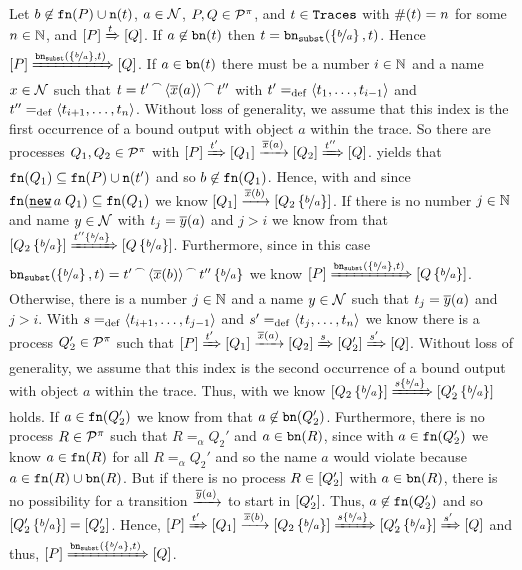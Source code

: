 \begin{prf}
Let $b\not\in\mathtt{fn}(P)\cup\mathtt{n}(t)$, $a\in\mathcal N$, $P,Q\in\mathcal P^{\pi}$, and $t\in\mathtt{Traces}$ with $\#(t)=n$ for some $n\in\mathbb N$, and $\left[P\right]\xRightarrow{t}\left[Q\right]$. If $a\not\in\mathtt{bn}(t)$ then $t=\mathtt{bn}_{\mathtt{subst}}(\left\{\nicefrac{b}{a}\right\},t)$. Hence $\left[P\right]\xRightarrow{\mathtt{bn}_{\mathtt{subst}}(\left\{\nicefrac{b}{a}\right\},t)}\left[Q\right]$. If $a\in\mathtt{bn}(t)$ there must be a number $i\in\mathbb N$ and a name $x\in\mathcal N$ such that $t={t'}^{\,\frown{}\,}{{\langle\overline{x}(a)\rangle}^{\,\frown{}\,}{t''}}$ with $t'=_{\mathrm{def}}{}\langle t_1,\ldots,t_{i-1}\rangle$ and $t''=_{\mathrm{def}}\langle t_{i+1},\ldots,t_n\rangle$. Without loss of generality, we assume that this index is the first occurrence of a bound output with object $a$ within the trace. So there are processes $Q_1,Q_2\in\mathcal P^{\pi}$ with $\left[P\right]\xRightarrow{t'}\left[Q_1\right]\xrightarrow{\overline{x}(a)}\left[Q_2\right]\xRightarrow{t''}\left[Q\right]$.  yields that $\mathtt{fn}(Q_1)\subseteq\mathtt{fn}(P)\cup\mathtt{n}(t')$ and so $b\not\in\mathtt{fn}(Q_1)$. Hence, with  and since $\fn{\procres{a}{Q_1}}\subseteq\fn{Q_1}$ we know $\left[Q_1\right]\xrightarrow{\overline{x}(b)}\left[Q_2\left\{\nicefrac{b}{a}\right\}\right]$. If there is no number $j\in\mathbb N$ and name $y\in\mathcal N$ with $t_j=\overline{y}(a)$ and $j>i$ we know from  that $\left[Q_2\left\{\nicefrac{b}{a}\right\}\right]\xRightarrow{t''\left\{\nicefrac{b}{a}\right\}}\left[Q\left\{\nicefrac{b}{a}\right\}\right]$. Furthermore, since in this case $\mathtt{bn}_{\mathtt{subst}}(\left\{\nicefrac{b}{a}\right\},t)={t'}^{\,\frown{}\,}{{\langle\overline{x}(b)\rangle}^{\,\frown{}\,}{t''\left\{\nicefrac{b}{a}\right\}}}$ we know $\left[P\right]\xRightarrow{\mathtt{bn}_{\mathtt{subst}}(\left\{\nicefrac{b}{a}\right\},t)}\left[Q\left\{\nicefrac{b}{a}\right\}\right]$. Otherwise, there is a number $j\in\mathbb N$ and a name $y\in\mathcal N$ such that $t_j=\overline{y}(a)$ and $j>i$. With $s=_{\mathrm{def}}{}\langle t_{i+1},\ldots,t_{j-1}\rangle$ and $s'=_{\mathrm{def}}\langle t_j,\ldots,t_n\rangle$ we know there is a process $Q_2'\in\mathcal P^{\pi}$ such that $\left[P\right]\xRightarrow{t'}\left[Q_1\right]\xrightarrow{\overline{x}(a)}\left[Q_2\right]\xRightarrow{s}\left[Q_2'\right]\xRightarrow{s'}\left[Q\right]$. Without loss of generality, we assume that this index is the second occurrence of a bound output with object $a$ within the trace. Thus, with  we know $\left[Q_2\left\{\nicefrac{b}{a}\right\}\right]\xRightarrow{s\left\{\nicefrac{b}{a}\right\}}\left[Q_2'\left\{\nicefrac{b}{a}\right\}\right]$ holds. If $a\in\mathtt{fn}(Q_2')$ we know from  that $a\not\in\mathtt{bn}(Q_2')$. Furthermore, there is no process $R\in\mathcal P^{\pi}$ such that $R=_\alpha{}Q_2'$ and $a\in\mathtt{bn}(R)$, since with $a\in\mathtt{fn}(Q_2')$ we know $a\in\mathtt{fn}(R)$ for all $R=_\alpha{}Q_2'$ and so the name $a$ would violate  because $a\in\mathtt{fn}(R)\cup\mathtt{bn}(R)$. But if there is no process $R\in\left[Q_2'\right]$ with $a\in\mathtt{bn}(R)$, there is no possibility for a transition $\xrightarrow{\overline{y}(a)}$ to start in $\left[Q_2'\right]$. Thus, $a\not\in\mathtt{fn}(Q_2')$ and so $\left[Q_2'\left\{\nicefrac{b}{a}\right\}\right]=\left[Q_2'\right]$. Hence, $\left[P\right]\xRightarrow{t'}\left[Q_1\right]\xrightarrow{\overline{x}(b)}\left[Q_2\left\{\nicefrac{b}{a}\right\}\right]\xRightarrow{s\left\{\nicefrac{b}{a}\right\}}\left[Q_2'\left\{\nicefrac{b}{a}\right\}\right]\xRightarrow{s'}\left[Q\right]$ and thus, $\left[P\right]\xRightarrow{\mathtt{bn}_{\mathtt{subst}}(\left\{\nicefrac{b}{a}\right\},t)}\left[Q\right]$.
\end{prf}

